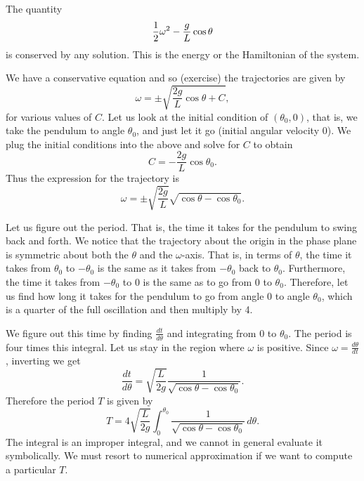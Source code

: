 The quantity 
\begin{equation*}
\frac{1}{2} \omega^2  - \frac{g}{L} \cos \theta 
\avoidbreak
\end{equation*}
is conserved by any solution.  This is the energy or the Hamiltonian of
the system.

We have a conservative equation and so (exercise) the
trajectories are given by
\begin{equation*}
\omega = \pm \sqrt{ \frac{2g}{L} \cos \theta + C} ,
\end{equation*}
for various values of $C$.  
Let us look at the initial condition of $(\theta_0,0)$,
that is, we take the pendulum to
angle $\theta_0$, and just let it go (initial angular velocity 0).
We plug the initial conditions into the above and solve for $C$ to obtain
\begin{equation*}
C = - \frac{2g}{L} \cos \theta_0 .
\end{equation*}
Thus the expression for the trajectory is
\begin{equation*}
\omega = \pm \sqrt{ \frac{2g}{L}} \sqrt{ \cos \theta - \cos \theta_0 } .
\end{equation*}

Let us figure out the period.  That is, the time it takes for the pendulum
to swing back and forth.
We notice that the trajectory about the
origin in the phase plane is symmetric about both the $\theta$ and the
$\omega$-axis.  That is, in terms of $\theta$,
the time it takes from $\theta_0$ to $-\theta_0$
is the same as it takes from $-\theta_0$ back to $\theta_0$.  Furthermore,
the time it takes from $-\theta_0$ to $0$ is the same as to go from $0$ to
$\theta_0$.  Therefore, let us find how long it takes for
the pendulum to go from angle 0 to angle $\theta_0$, which is a quarter of
the full oscillation and then multiply by 4.

We figure out this time by finding
$\frac{dt}{d\theta}$ and integrating from $0$ to $\theta_0$.
The period is four times
this integral.  Let us stay in the region where $\omega$ is positive.
Since $\omega = \frac{d\theta}{dt}$, inverting we get
\begin{equation*}
\frac{dt}{d\theta} = \sqrt{\frac{L}{2g}} \frac{1}{\sqrt{\cos \theta - \cos \theta_0 }} .
\end{equation*}
Therefore the period $T$ is given by
\begin{equation*}
T = 4 \sqrt{\frac{L}{2g}} \int_0^{\theta_0} \frac{1}{\sqrt{\cos \theta -
\cos \theta_0 }}\, d\theta .
\end{equation*}
The integral is an improper integral, and we cannot in
general evaluate it symbolically.  We must resort to numerical
approximation if we want to compute a particular $T$.

